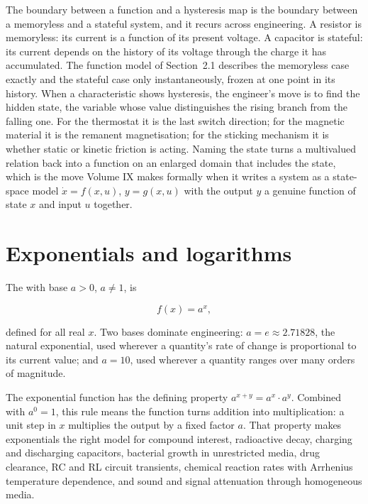 \begin{mastery}
The boundary between a function and a hysteresis map is the boundary
between a memoryless and a stateful system, and it recurs across
engineering. A resistor is memoryless: its current is a function of
its present voltage. A capacitor is stateful: its current depends on
the history of its voltage through the charge it has accumulated. The
function model of Section~2.1 describes the memoryless case exactly
and the stateful case only instantaneously, frozen at one point in
its history. When a characteristic shows hysteresis, the engineer's
move is to find the hidden state, the variable whose value
distinguishes the rising branch from the falling one. For the
thermostat it is the last switch direction; for the magnetic material
it is the remanent magnetisation; for the sticking mechanism it is
whether static or kinetic friction is acting. Naming the state turns
a multivalued relation back into a function on an enlarged domain
that includes the state, which is the move Volume IX makes formally
when it writes a system as a state-space model $\dot{x} = f(x, u)$,
$y = g(x, u)$ with the output $y$ a genuine function of state $x$ and
input $u$ together.
\end{mastery}

\section{Exponentials and logarithms}

The  with base $a > 0$, $a \neq 1$, is

\[
f(x) = a^{x},
\]

defined for all real $x$. Two bases dominate engineering: $a = e
\approx 2.71828$, the natural exponential, used wherever a quantity's
rate of change is proportional to its current value; and $a = 10$,
used wherever a quantity ranges over many orders of magnitude.

The exponential function has the defining property
$a^{x + y} = a^{x} \cdot a^{y}$. Combined with $a^{0} = 1$, this rule
means the function turns addition into multiplication: a unit step in
$x$ multiplies the output by a fixed factor $a$. That property makes
exponentials the right model for compound interest, radioactive
decay, charging and discharging capacitors, bacterial growth in
unrestricted media, drug clearance, RC and RL circuit transients,
chemical reaction rates with Arrhenius temperature dependence, and
sound and signal attenuation through homogeneous media.

